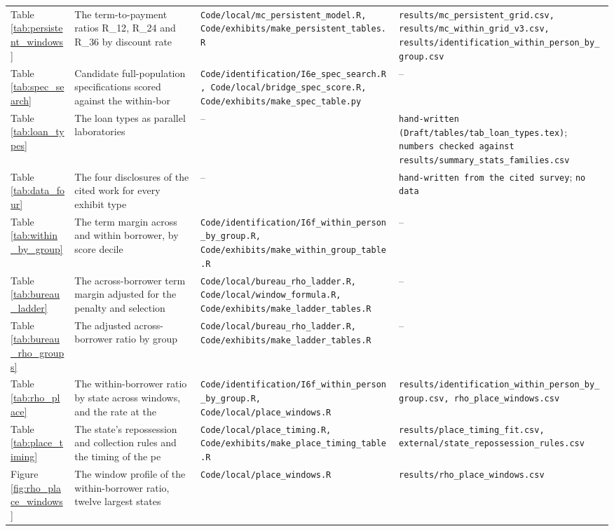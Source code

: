 \begin{longtable}{@{}p{}p{}p{}p{}@{}}
Table \ref{tab:persistent_windows} & The term-to-payment ratios R\_{12}, R\_{24} and R\_{36} by discount rate  & \texttt{Code/local/mc\_persistent\_model.R, Code/exhibits/make\_persistent\_tables.R} & \texttt{results/mc\_persistent\_grid.csv, results/mc\_within\_grid\_v3.csv, results/identification\_within\_person\_by\_group.csv} \\
Table \ref{tab:spec_search} & Candidate full-population specifications scored against the within-bor & \texttt{Code/identification/I6e\_spec\_search.R, Code/local/bridge\_spec\_score.R, Code/exhibits/make\_spec\_table.py} & -- \\
Table \ref{tab:loan_types} & The loan types as parallel laboratories & -- & \texttt{hand-written (Draft/tables/tab\_loan\_types.tex)}; \texttt{numbers checked against results/summary\_stats\_families.csv} \\
Table \ref{tab:data_four} & The four disclosures of the cited work for every exhibit type & -- & \texttt{hand-written from the cited survey}; \texttt{no data} \\
Table \ref{tab:within_by_group} & The term margin across and within borrower, by score decile & \texttt{Code/identification/I6f\_within\_person\_by\_group.R, Code/exhibits/make\_within\_group\_table.R} & -- \\
Table \ref{tab:bureau_ladder} & The across-borrower term margin adjusted for the penalty and selection & \texttt{Code/local/bureau\_rho\_ladder.R, Code/local/window\_formula.R, Code/exhibits/make\_ladder\_tables.R} & -- \\
Table \ref{tab:bureau_rho_groups} & The adjusted across-borrower ratio by group & \texttt{Code/local/bureau\_rho\_ladder.R, Code/exhibits/make\_ladder\_tables.R} & -- \\
Table \ref{tab:rho_place} & The within-borrower ratio by state across windows, and the rate at the & \texttt{Code/identification/I6f\_within\_person\_by\_group.R, Code/local/place\_windows.R} & \texttt{results/identification\_within\_person\_by\_group.csv, rho\_place\_windows.csv} \\
Table \ref{tab:place_timing} & The state's repossession and collection rules and the timing of the pe & \texttt{Code/local/place\_timing.R, Code/exhibits/make\_place\_timing\_table.R} & \texttt{results/place\_timing\_fit.csv, external/state\_repossession\_rules.csv} \\
Figure \ref{fig:rho_place_windows} & The window profile of the within-borrower ratio, twelve largest states & \texttt{Code/local/place\_windows.R} & \texttt{results/rho\_place\_windows.csv} \\

\end{longtable}
